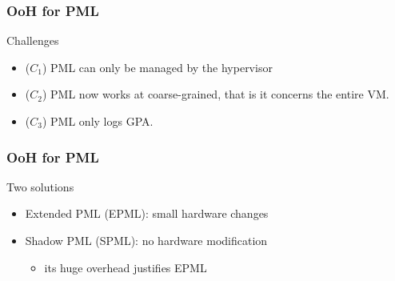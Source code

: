 \documentclass[xcolor=table,bigger,unknownkeysallowed]{beamer}
\begin{document}
        \begin{frame}
                \frametitle{OoH for PML}			
			\begin{block}{Challenges}
				\begin{itemize}
					\item ($C_1$) PML can only be managed by the hypervisor
					\item ($C_2$) PML now works at coarse-grained, that is it concerns the entire VM.
					\item ($C_3$) PML only logs GPA.
				\end{itemize}
			\end{block} 
        \end{frame}         
        \begin{frame}
                \frametitle{OoH for PML}			
			\begin{block}{Two solutions}
				\begin{itemize}
					\item Extended PML (EPML): small hardware changes
					\item Shadow PML (SPML): no hardware modification					
					\begin{itemize}
						\item its huge overhead justifies EPML
					\end{itemize}
				\end{itemize}
			\end{block} 
        \end{frame}  
\end{document}
